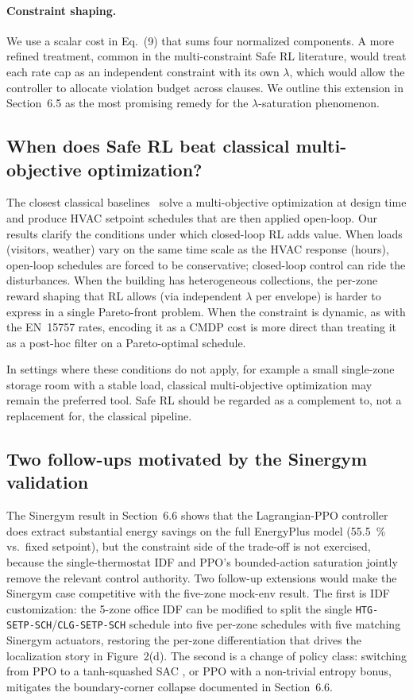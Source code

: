 \documentclass[11pt,a4paper]{article}
\begin{document}
\paragraph{Constraint shaping.}
We use a scalar cost in Eq.~(9) that sums four normalized
components. A more refined treatment, common in the multi-constraint
Safe RL literature, would treat each rate cap as an independent
constraint with its own $\lambda$, which would allow the controller
to allocate violation budget across clauses. We outline this extension
in Section~6.5 as the most promising remedy
for the $\lambda$-saturation phenomenon.

\subsection{When does Safe RL beat classical multi-objective optimization?}

The closest classical baselines~\citep{ascione2018museum,schito2020museum}
solve a multi-objective optimization at design time and produce HVAC
setpoint schedules that are then applied open-loop. Our results clarify
the conditions under which closed-loop RL adds value. When loads
(visitors, weather) vary on the same time scale as the HVAC response
(hours), open-loop schedules are forced to be conservative; closed-loop
control can ride the disturbances. When the building has heterogeneous
collections, the per-zone reward shaping that RL allows (via
independent $\lambda$ per envelope) is harder to express in a single
Pareto-front problem. When the constraint is dynamic, as with the
EN~15757 rates, encoding it as a CMDP cost is more direct than
treating it as a post-hoc filter on a Pareto-optimal schedule.

In settings where these conditions do not apply, for example a small
single-zone storage room with a stable load, classical multi-objective
optimization may remain the preferred tool. Safe RL should be regarded
as a complement to, not a replacement for, the classical pipeline.

\subsection{Two follow-ups motivated by the Sinergym validation}

The Sinergym result in Section~6.6 shows
that the Lagrangian-PPO controller does extract substantial energy
savings on the full EnergyPlus model (\SI{55.5}{\percent} vs.\ fixed
setpoint), but the constraint side of the trade-off is not exercised,
because the single-thermostat IDF and PPO's bounded-action saturation
jointly remove the relevant control authority. Two follow-up
extensions would make the Sinergym case competitive with the
five-zone mock-env result. The first is IDF customization: the 5-zone
office IDF can be modified to split the single
\texttt{HTG-SETP-SCH}/\texttt{CLG-SETP-SCH} schedule into five
per-zone schedules with five matching Sinergym actuators, restoring
the per-zone differentiation that drives the localization story in
Figure~2(d). The second is a change of policy class:
switching from PPO to a tanh-squashed SAC
\citep{ji2023omnisafe}, or PPO with a
non-trivial entropy bonus, mitigates the boundary-corner collapse
documented in Section~6.6.
\end{document}

